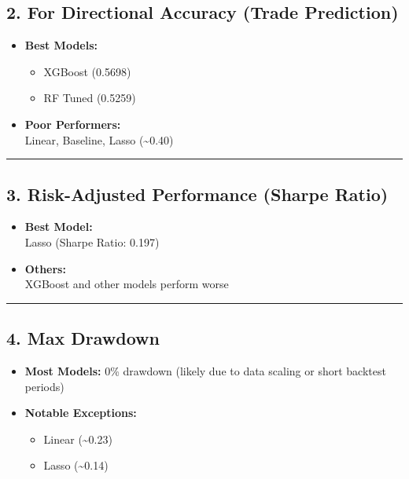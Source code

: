 \documentclass[
]{article}
\providecommand{\tightlist}{%
  \setlength{\itemsep}{0pt}\setlength{\parskip}{0pt}}
\begin{document}
\subsection{2. For Directional Accuracy (Trade
Prediction)}\label{for-directional-accuracy-trade-prediction}

\begin{itemize}
\tightlist
\item
  \textbf{Best Models:}

  \begin{itemize}
  \tightlist
  \item
    XGBoost (0.5698)\\
  \item
    RF Tuned (0.5259)
  \end{itemize}
\item
  \textbf{Poor Performers:}\\
  Linear, Baseline, Lasso (\textasciitilde0.40)
\end{itemize}

\begin{center}\rule{0.5\linewidth}{0.5pt}\end{center}

\subsection{3. Risk-Adjusted Performance (Sharpe
Ratio)}\label{risk-adjusted-performance-sharpe-ratio}

\begin{itemize}
\item
  \textbf{Best Model:}\\
  Lasso (Sharpe Ratio: 0.197)
\item
  \textbf{Others:}\\
  XGBoost and other models perform worse
\end{itemize}

\begin{center}\rule{0.5\linewidth}{0.5pt}\end{center}

\subsection{4. Max Drawdown}\label{max-drawdown}

\begin{itemize}
\tightlist
\item
  \textbf{Most Models:} 0\% drawdown (likely due to data scaling or
  short backtest periods)\\
\item
  \textbf{Notable Exceptions:}

  \begin{itemize}
  \tightlist
  \item
    Linear (\textasciitilde0.23)\\
  \item
    Lasso (\textasciitilde0.14)
  \end{itemize}
\end{itemize}
\end{document}

